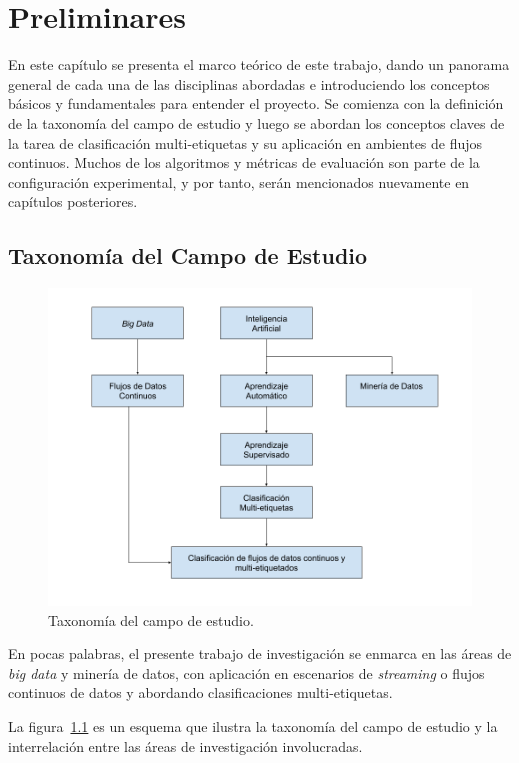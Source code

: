 \chapter{Preliminares}
\label{chapter:preliminares}

En este capítulo se presenta el marco teórico de este trabajo, dando un panorama
general de cada una de las disciplinas abordadas e introduciendo los conceptos
básicos y fundamentales para entender el proyecto. Se comienza con la definición
de la taxonomía del campo de estudio y luego se abordan los conceptos claves de
la tarea de clasificación multi-etiquetas y su aplicación en ambientes de flujos
continuos. Muchos de los algoritmos y métricas de evaluación son parte de la
configuración experimental, y por tanto, serán mencionados nuevamente en
capítulos posteriores.

\section{Taxonomía del Campo de Estudio}

\begin{figure}[htbp]
	\includegraphics[width=.9\linewidth]{figures/study_field_taxonomy_v2.png}
	\centering
	\caption{Taxonomía del campo de estudio.}
	\label{fig:campo_estudio}
\end{figure}

En pocas palabras, el presente trabajo de investigación se enmarca en las áreas
de \textit{big data} y minería de datos, con aplicación en escenarios de
\textit{streaming} o flujos continuos de datos y abordando clasificaciones
multi-etiquetas.

La figura~\ref{fig:campo_estudio} es un esquema que ilustra la taxonomía del
campo de estudio y la interrelación entre las áreas de investigación
involucradas.

